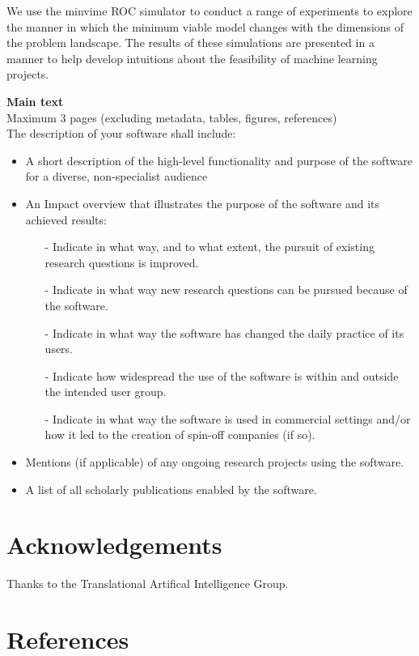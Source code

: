 \documentclass[preprint,12pt, a4paper]{elsarticle}
\begin{document}
We use the minvime ROC simulator to conduct a range of experiments to explore the manner in which the minimum viable
model changes with the dimensions of the problem landscape.
The results of these simulations are presented in a manner to help develop
intuitions about the feasibility of machine learning projects.




\textbf{Main text}\\
Maximum 3 pages (excluding metadata, tables, figures, references)\\

\noindent
The description of your software  shall include:
\begin{itemize}
\item A short description of the high-level functionality and purpose of the software for a diverse, non-specialist audience
\item An Impact overview that illustrates the purpose of the software and its achieved results:
\begin{itemize}
\item[-] Indicate in what way, and to what extent, the pursuit of existing research questions is improved. 
\item[-] Indicate in what way new research questions can be pursued because of the software.
\item[-] Indicate in what way the software has changed the daily practice of its users.
\item[-] Indicate how widespread the use of the software is within and outside the intended user group.
\item[-] Indicate in what way the software is used in commercial settings and/or how it led to the creation of spin-off companies (if so).
\end{itemize}
\item Mentions (if applicable) of any ongoing research projects using the software. 
\item A list of all scholarly publications enabled by the software.
\end{itemize}


\section*{Acknowledgements}
\label{}

Thanks to the Translational Artifical Intelligence Group.

\section*{References}
\end{document}
